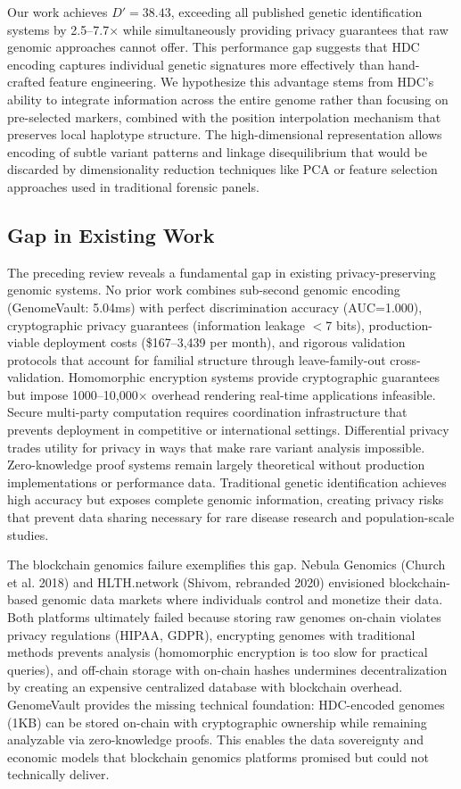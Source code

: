 \documentclass[11pt,letterpaper]{article}
\begin{document}
Our work achieves $D'=38.43$, exceeding all published genetic identification systems by 2.5--7.7$\times$ while simultaneously providing privacy guarantees that raw genomic approaches cannot offer. This performance gap suggests that HDC encoding captures individual genetic signatures more effectively than hand-crafted feature engineering. We hypothesize this advantage stems from HDC's ability to integrate information across the entire genome rather than focusing on pre-selected markers, combined with the position interpolation mechanism that preserves local haplotype structure. The high-dimensional representation allows encoding of subtle variant patterns and linkage disequilibrium that would be discarded by dimensionality reduction techniques like PCA or feature selection approaches used in traditional forensic panels.

\subsection{Gap in Existing Work}

The preceding review reveals a fundamental gap in existing privacy-preserving genomic systems. No prior work combines sub-second genomic encoding (GenomeVault: 5.04ms) with perfect discrimination accuracy (AUC=1.000), cryptographic privacy guarantees (information leakage $<$7 bits), production-viable deployment costs (\$167--3,439 per month), and rigorous validation protocols that account for familial structure through leave-family-out cross-validation. Homomorphic encryption systems provide cryptographic guarantees but impose 1000--10,000$\times$ overhead rendering real-time applications infeasible. Secure multi-party computation requires coordination infrastructure that prevents deployment in competitive or international settings. Differential privacy trades utility for privacy in ways that make rare variant analysis impossible. Zero-knowledge proof systems remain largely theoretical without production implementations or performance data. Traditional genetic identification achieves high accuracy but exposes complete genomic information, creating privacy risks that prevent data sharing necessary for rare disease research and population-scale studies.

The blockchain genomics failure exemplifies this gap. Nebula Genomics (Church et al. 2018) and HLTH.network (Shivom, rebranded 2020) envisioned blockchain-based genomic data markets where individuals control and monetize their data. Both platforms ultimately failed because storing raw genomes on-chain violates privacy regulations (HIPAA, GDPR), encrypting genomes with traditional methods prevents analysis (homomorphic encryption is too slow for practical queries), and off-chain storage with on-chain hashes undermines decentralization by creating an expensive centralized database with blockchain overhead. GenomeVault provides the missing technical foundation: HDC-encoded genomes (1KB) can be stored on-chain with cryptographic ownership while remaining analyzable via zero-knowledge proofs. This enables the data sovereignty and economic models that blockchain genomics platforms promised but could not technically deliver.
\end{document}
